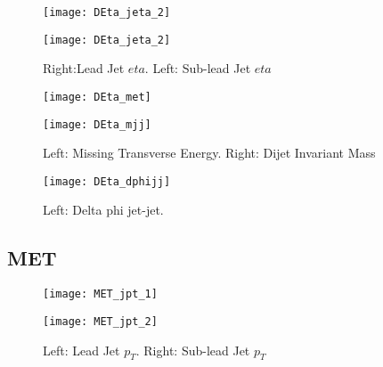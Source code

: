 \documentclass[a4paper,10pt]{article}
\begin{document}
\begin{figure}[!h]
\centering
\begin{minipage}[!h]{0.4\linewidth}
\centering
\texttt{[image: DEta\_jeta\_2]}
\end{minipage}%
\begin{minipage}[!h]{0.4\linewidth}
\centering
\texttt{[image: DEta\_jeta\_2]}
\end{minipage}
\caption{Right:Lead Jet $eta$. Left: Sub-lead Jet $eta$}
\end{figure}

\begin{figure}[!h]
\centering
\begin{minipage}[!h]{0.4\linewidth}
\centering
\texttt{[image: DEta\_met]}
\end{minipage}%
\begin{minipage}[!h]{0.4\linewidth}
\centering
\texttt{[image: DEta\_mjj]}
\end{minipage}
\caption{Left: Missing Transverse Energy. Right: Dijet Invariant Mass}
\end{figure}

\begin{figure}[!h]
\centering
\begin{minipage}[!h]{0.4\linewidth}
\centering
\texttt{[image: DEta\_dphijj]}
\end{minipage}%
\begin{minipage}[!h]{0.4\linewidth}
\centering
\end{minipage}
\caption{Left: Delta phi jet-jet.}
\end{figure}

\clearpage
\subsection{MET}
     
\begin{figure}[!h]
\centering
\begin{minipage}[!h]{0.4\linewidth}
\centering
\texttt{[image: MET\_jpt\_1]}
\end{minipage}%
\begin{minipage}[!h]{0.4\linewidth}
  \texttt{[image: MET\_jpt\_2]}
\end{minipage}
\caption{Left: Lead Jet $p_T$. Right: Sub-lead Jet $p_T$}
\end{figure}
\end{document}
